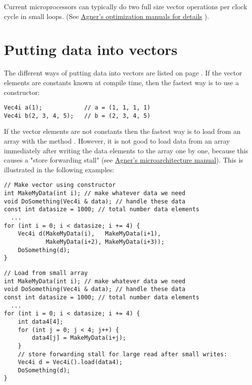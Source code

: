 \documentclass[vcl_manual.tex]{subfiles}
\begin{document}
Current microprocessors can typically do two full size vector operations per clock cycle in small loops. (See \href{https://www.agner.org/optimize/#manuals}{Agner's optimization manuals for details} ).


\section{Putting data into vectors}\label{PuttingDataIntoVectors}

The different ways of putting data into vectors are listed on page \pageref{ConstructingVectors}. If the vector elements are constants known at compile time, then the fastest way is to use a constructor:
\begin{example}
\label{exampleVectConstructor}
\end{example}
\begin{lstlisting}[frame=single]
Vec4i a(1);            // a = (1, 1, 1, 1)
Vec4i b(2, 3, 4, 5);   // b = (2, 3, 4, 5)
\end{lstlisting}

If the vector elements are not constants then the fastest way is to load from an array with the method . However, it is not good to load data from an array immediately after writing the data elements to the array one by one, because this causes a "store forwarding stall" (see \href{https://www.agner.org/optimize/#manual_cpp}{Agner's microarchitecture manual}). This is illustrated in the following examples:

\begin{example}
\label{exampleArrayLoopV}
\end{example}
\begin{lstlisting}[frame=single]
// Make vector using constructor
int MakeMyData(int i); // make whatever data we need
void DoSomething(Vec4i & data); // handle these data
const int datasize = 1000; // total number data elements
  ...
for (int i = 0; i < datasize; i += 4) {
    Vec4i d(MakeMyData(i),   MakeMyData(i+1),
            MakeMyData(i+2), MakeMyData(i+3));
    DoSomething(d);
}
\end{lstlisting}


\begin{example}
\label{exampleArrayLoopW}
\end{example}
\begin{lstlisting}[frame=single]
// Load from small array
int MakeMyData(int i); // make whatever data we need
void DoSomething(Vec4i & data); // handle these data
const int datasize = 1000; // total number data elements
  ...
for (int i = 0; i < datasize; i += 4) {
    int data4[4];
    for (int j = 0; j < 4; j++) {
        data4[j] = MakeMyData(i+j); 
    }
    // store forwarding stall for large read after small writes:
    Vec4i d = Vec4i().load(data4);
    DoSomething(d);
}
\end{lstlisting}
\end{document}
